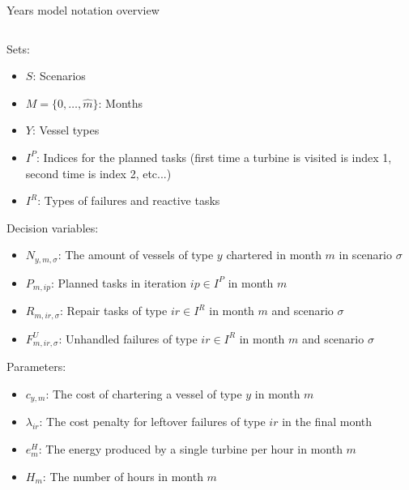 \documentclass{beamer}
\newcommand{\smalld}{\tiny}
\begin{document}
\begin{frame}{Years model notation overview}
\smalld
\begin{columns}
\begin{column}{.48\textwidth}
Sets:
\begin{itemize}
\item $S$: Scenarios
\item $M = \{0 , \dots , \hat{m}\}$: Months
\item $Y$: Vessel types
\item $I^P$: Indices for the planned tasks (first time a turbine is visited is index 1, second time is index 2, etc...)
\item $I^R$: Types of failures and reactive tasks
\end{itemize}

Decision variables:
\begin{itemize}
\item $N_{y,m,\sigma}$: The amount of vessels of type $y$ chartered in month $m$ in scenario $\sigma$
\item $P_{m,ip}$: Planned tasks in iteration $ip \in I^P$ in month $m$
\item $R_{m,ir,\sigma}$: Repair tasks of type $ir \in I^R$ in month $m$ and scenario $\sigma$
\item $F^U_{m,ir,\sigma}$: Unhandled failures of type $ir \in I^R$ in month $m$ and scenario $\sigma$
\end{itemize}

Parameters:
\begin{itemize}
\item $c_{y,m}$: The cost of chartering a vessel of type $y$ in month $m$
\item $\lambda_{ir}$: The cost penalty for leftover failures of type $ir$ in the final month
\item $e^H_m$: The energy produced by a single turbine per hour in month $m$
\item $H_m$: The number of hours in month $m$
\end{itemize}
\end{column}

\hfill


\end{columns}
\end{frame}
\end{document}
